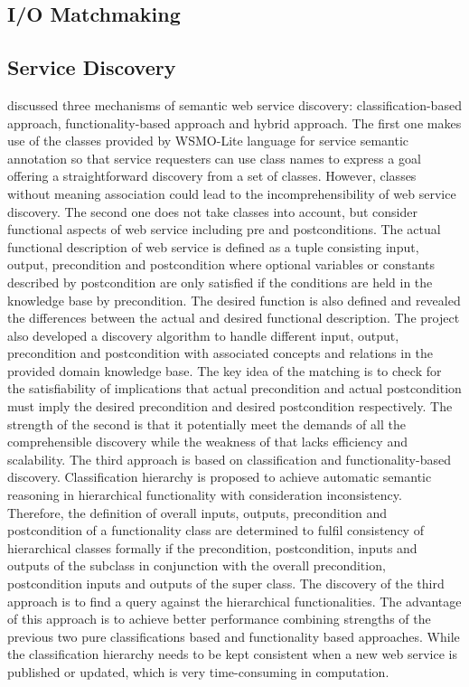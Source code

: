 \subsection{I/O Matchmaking}\label{matchmaking}
\subsection{Service Discovery}\label{servicediscovery}
\cite{agarwal2009d5} discussed three mechanisms of semantic web service discovery: classification-based approach, functionality-based approach and hybrid approach. The first one makes use of the classes provided by WSMO-Lite language for service semantic annotation so that service requesters can use class names to express a goal offering a straightforward discovery from a set of classes. However, classes without meaning association could lead to the incomprehensibility of web service discovery.  The second one does not take classes into account, but consider functional aspects of web service including pre and postconditions. The actual functional description of web service is defined as a tuple consisting input, output, precondition and postcondition where optional variables or constants described by postcondition are only satisfied if the conditions are held in the knowledge base by precondition. The desired function is also defined and revealed the differences between the actual and desired functional description. The project also developed a discovery algorithm to handle different input, output, precondition and postcondition with associated concepts and relations in the provided domain knowledge base. The key idea of the matching is to check for the satisfiability of implications that actual precondition and actual postcondition must imply the desired precondition and desired postcondition respectively.  The strength of the second is that it potentially meet the demands of all the comprehensible discovery while the weakness of that lacks efficiency and scalability. The third approach is based on classification and functionality-based discovery. Classification hierarchy is proposed to achieve automatic semantic reasoning in hierarchical functionality with consideration inconsistency. Therefore, the definition of overall inputs, outputs, precondition and postcondition of a functionality class are determined to fulfil consistency of hierarchical classes formally if the precondition, postcondition, inputs and outputs of the subclass in conjunction with the overall precondition, postcondition inputs and outputs of the super class. The discovery of the third approach is to find a query against the hierarchical functionalities. The advantage of this approach is to achieve better performance combining strengths of the previous two pure classifications based and functionality based approaches. While the classification hierarchy needs to be kept consistent when a new web service is published or updated, which is very time-consuming in computation.​


